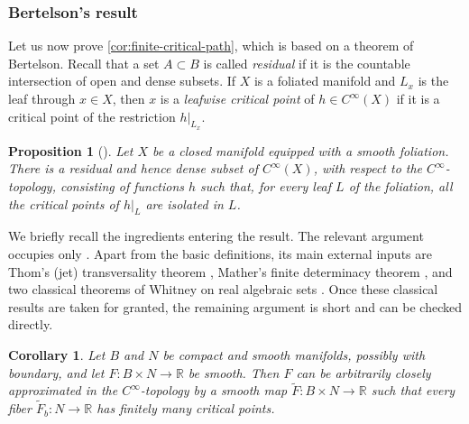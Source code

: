 \documentclass[11pt]{amsart}
\numberwithin{equation}{section}
\newtheorem{proposition}[theorem]{Proposition}
\newtheorem{corollary}[theorem]{Corollary}
\begin{document}
\subsubsection{Bertelson's result}\label{sec:parametric-input}

Let us now prove \cref{cor:finite-critical-path}, which is based on a theorem of Bertelson.
Recall that a set $A\subset B$ is called \emph{residual} if it is the countable intersection of open and dense subsets.
If $X$ is a foliated manifold and $L_x$ is the leaf through $x\in X$, then $x$ is a \emph{leafwise critical point} of $h\in C^\infty(X)$ if it is a critical point of the restriction $h|_{L_x}$.



\begin{proposition}[{\cite[Proposition~3.21]{Bertelson2002}}]
\label{thm:bertelson-isolated}
Let $X$ be a closed manifold  equipped with a smooth foliation. There is a residual and hence dense subset
of $C^\infty(X)$, with respect to the $C^\infty$-topology, consisting of
functions $h$ such that, for every leaf $L$ of the foliation, all the critical
points of $h|_L$ are isolated in $L$.
\end{proposition}
We briefly recall the ingredients entering the
result. The
relevant argument occupies only \cite[pp.~386--391]{Bertelson2002}. Apart from
the basic definitions, its main external inputs are Thom's (jet) transversality theorem
\cite[Theorem~3.1]{Bertelson2002}, Mather's finite determinacy theorem
\cite[Theorem~3.15]{Bertelson2002}, and two classical theorems of Whitney on
real algebraic sets \cite[Theorems~3.17 and~3.18]{Bertelson2002}. Once these
classical results are taken for granted, the remaining argument is short and can be
checked directly. 

\begin{corollary}\label{cor:igusa-finite-critical}
  Let $B$ and $N$ be compact and smooth manifolds, possibly with boundary, and let $F:B\times N\to\mathbb R$ be smooth. 
  Then $F$ can be arbitrarily closely approximated in the $C^\infty$-topology by a smooth map $\widetilde F:B\times N\to\mathbb R$ such that every fiber $\widetilde F_b:N\to\mathbb R$ has finitely many critical points.
\end{corollary}
\end{document}
